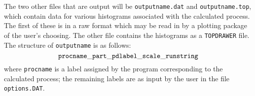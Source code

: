\documentclass[12pt]{article}
\begin{document}
The two other files that are output will be {\tt outputname.dat} and
{\tt outputname.top}, which contain data for various histograms associated
with the calculated process. The first of these is in a raw format 
which may be read in by a plotting package of the user's choosing. The
other file contains the histograms as a {\tt TOPDRAWER} file. The structure
of {\tt outputname} is as follows:
\begin{displaymath}
{\tt procname\_part\_pdlabel\_scale\_runstring}
\end{displaymath}
where {\tt procname} is a label assigned by the program corresponding to
the calculated process; the remaining labels are as input by the user
in the file {\tt options.DAT}.
 
\end{document}
